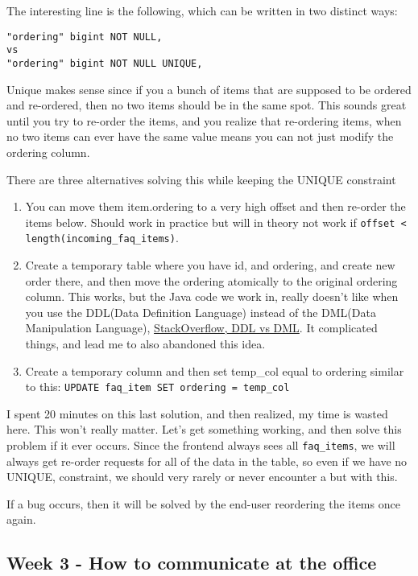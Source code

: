 \documentclass[../main.tex]{subfiles}
\begin{document}
The interesting line is the following, which can be written in two distinct ways:

\begin{verbatim}
"ordering" bigint NOT NULL,
vs
"ordering" bigint NOT NULL UNIQUE,
\end{verbatim}

Unique makes sense since if you a bunch of items that are supposed to be ordered and re-ordered, then no two items should be in the same spot. This sounds great until you try to re-order the items, and you realize that re-ordering items, when no two items can ever have the same value means you can not just modify the ordering column.

There are three alternatives solving this while keeping the UNIQUE constraint

\begin{enumerate}
\def\labelenumi{\arabic{enumi}.}
\item You can move them item.ordering to a very high offset and then re-order the items below. Should work in practice but will in theory not work if \verb|offset < length(incoming_faq_items)|. 

\item  Create a temporary table where you have id, and ordering, and create new order there, and then move the ordering atomically to the original ordering column. This works, but the Java code we work in, really doesn't like when you use the DDL(Data Definition Language) instead of the DML(Data Manipulation Language), \href{https://stackoverflow.com/questions/2578194/what-are-ddl-and-dml}{StackOverflow, DDL vs DML}. It complicated things, and lead me to also abandoned this idea.
\item Create a temporary column and then set temp\_col equal to ordering similar to this: \verb|UPDATE faq_item SET ordering = temp_col|
\end{enumerate}


I spent 20 minutes on this last solution, and then realized, my time is wasted here. This won't really matter. Let's get something working, and then solve this problem if it ever occurs. Since the frontend always sees all \verb|faq_items|, we will always get re-order requests for all of the data in the table, so even if we have no UNIQUE, constraint, we should very rarely or never encounter a but with this.

If a bug occurs, then it will be solved by the end-user reordering the items once again.\strut

\subsection{Week 3 - How to communicate at the office}
\end{document}
